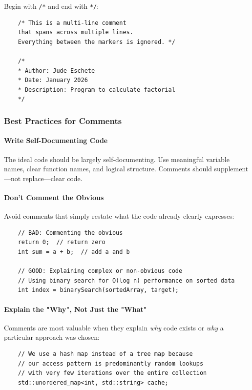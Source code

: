 Begin with \texttt{/*} and end with \texttt{*/}:

\begin{lstlisting}
	/* This is a multi-line comment
	that spans across multiple lines.
	Everything between the markers is ignored. */
	
	/*
	* Author: Jude Eschete
	* Date: January 2026
	* Description: Program to calculate factorial
	*/
\end{lstlisting}

\subsubsection{Best Practices for Comments}

\paragraph{Write Self-Documenting Code}

The ideal code should be largely self-documenting. Use meaningful variable names, clear function names, and logical structure. Comments should supplement—not replace—clear code.

\paragraph{Don't Comment the Obvious}

Avoid comments that simply restate what the code already clearly expresses:

\begin{lstlisting}
	// BAD: Commenting the obvious
	return 0;  // return zero
	int sum = a + b;  // add a and b
	
	// GOOD: Explaining complex or non-obvious code
	// Using binary search for O(log n) performance on sorted data
	int index = binarySearch(sortedArray, target);
\end{lstlisting}

\paragraph{Explain the "Why", Not Just the "What"}

Comments are most valuable when they explain \textit{why} code exists or \textit{why} a particular approach was chosen:

\begin{lstlisting}
	// We use a hash map instead of a tree map because
	// our access pattern is predominantly random lookups
	// with very few iterations over the entire collection
	std::unordered_map<int, std::string> cache;
\end{lstlisting}

